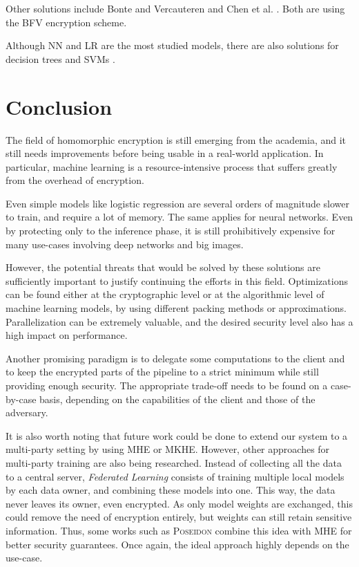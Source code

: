\documentclass[a4paper,11pt,oneside]{report}
\begin{document}
Other solutions include Bonte and Vercauteren \cite{bonte_privacy-preserving_2018} and Chen et al. \cite{chen_logistic_2018}.
Both are using the BFV encryption scheme.

Although NN and LR are the most studied models, there are also solutions for decision trees \cite{akavia_privacy-preserving_2019} and SVMs \cite{park_he-friendly_2020}.


\chapter{Conclusion}


The field of homomorphic encryption is still emerging from the academia, and it still needs improvements before being usable in a real-world application. 
In particular, machine learning is a resource-intensive process that suffers greatly from the overhead of encryption.

Even simple models like logistic regression are several orders of magnitude slower to train, and require a lot of memory. 
The same applies for neural networks. Even by protecting only to the inference phase, it is still prohibitively expensive for many use-cases involving deep networks and big images.

However, the potential threats that would be solved by these solutions are sufficiently important to justify continuing the efforts in this field.
Optimizations can be found either at the cryptographic level or at the algorithmic level of machine learning models, by using different packing methods or approximations.
Parallelization can be extremely valuable, and the desired security level also has a high impact on performance.

Another promising paradigm is to delegate some computations to the client and to keep the encrypted parts of the pipeline to a strict minimum while still providing enough security. 
The appropriate trade-off needs to be found on a case-by-case basis, depending on the capabilities of the client and those of the adversary.

It is also worth noting that future work could be done to extend our system to a multi-party setting by using MHE or MKHE. 
However, other approaches for multi-party training are also being researched. 
Instead of collecting all the data to a central server, \emph{Federated Learning} consists of training multiple local models by each data owner, and combining these models into one.
This way, the data never leaves its owner, even encrypted.
As only model weights are exchanged, this could remove the need of encryption entirely, but weights can still retain sensitive information.
Thus, some works such as \textsc{Poseidon} \cite{sav_poseidon_2021} combine this idea with MHE for better security guarantees.
Once again, the ideal approach highly depends on the use-case. 
\end{document}
